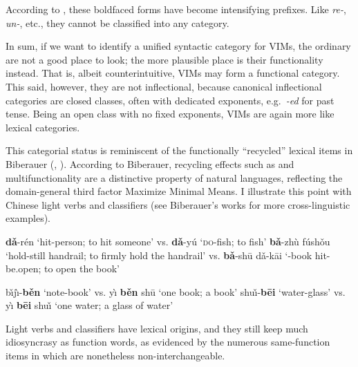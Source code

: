 \documentclass[output=paper]{langsci/langscibook}
\begin{document}
\noindent According to \citet{Kageyama1993}, these boldfaced forms have become
intensifying prefixes. Like  \textit{re-}, \textit{un-}, etc., they
cannot be classified into any category.


In sum, if we want to identify a unified syntactic category for \glspl{VIM}, the ordinary
 are not a good place to look; the more plausible place
is their functionality instead. That is, albeit counterintuitive, \glspl{VIM}
may form a functional category. This said, however, they are not inflectional,
because canonical inflectional categories are closed classes, often with
dedicated exponents, e.g.\ \textit{-ed} for past tense. Being an open class
with no fixed exponents, \glspl{VIM} are again more
like lexical categories.

This categorial status is reminiscent of the functionally ``recycled'' lexical
items in Biberauer (\citeyear{Biberauer2016b}, \citeyear{Biberauer2017}).
According to Biberauer, recycling effects such as  and
multifunctionality are a distinctive property of natural languages, reflecting
the domain-general third factor Maximize Minimal Means. I illustrate this point
with Chinese light verbs  and classifiers  (see
Biberauer's works for more cross-linguistic examples).

\ea\label{ex:light}
\ea
\textbf{d\v{a}}-r\'{e}n {`hit-person; to hit someone' vs.}  \textbf{d\v{a}}-y\'{u} {`\textsc{do}-fish; to fish'}
\ex
\textbf{b\v{a}}-zh\`{u} f\'{u}sh\v{o}u {`hold-still handrail; to firmly hold
the handrail' vs.} \textbf{b\v{a}}-sh\={u} d\v{a}-k\={a}i {`\Disp{}-book hit-be.open; to open the book'}
\z
\z

\ea\label{ex:cl}
    \ea b\v{\i}j\`{\i}-\textbf{b\v{e}n} {`note-book' vs.} y\`{\i} \textbf{b\v{e}n} sh\={u} {`one \Clf{} book; a book'}
    \ex shu\v{\i}-\textbf{b\={e}i} {`water-glass' vs.} y\`{\i} \textbf{b\={e}i} shu\v{\i} {`one \Clf{} water; a glass of water'}
    \z
\z

\noindent Light verbs and classifiers have lexical origins, and they still keep
much idiosyncrasy as function words, as evidenced by the numerous same-function
items in  which are nonetheless non-interchangeable.
\end{document}
